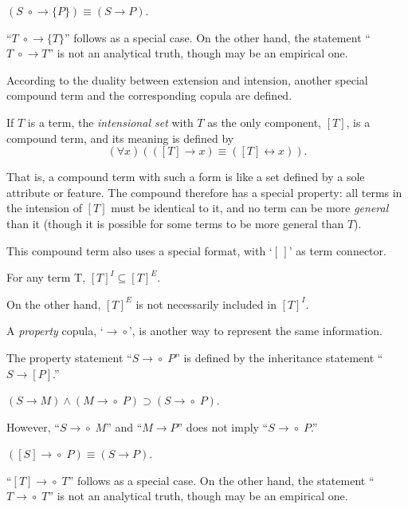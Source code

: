 \begin{theo}
\((S \;\circ\!\!\rightarrow \{P\}) \equiv (S \rightarrow P)\).
\end{theo}
``\(T \;\circ\!\!\rightarrow \{T\}\)'' follows as a special case.  On the other hand, the statement ``\(T \;\circ\!\!\rightarrow T\)'' is not an analytical truth, though may be an empirical one.

According to the duality between extension and intension, another special compound term and the corresponding copula are defined.

\begin{defi}
If $T$ is a term, the {\em intensional set} with $T$ as the only component, \([T]\), is a compound term, and its meaning is defined by
\[(\forall x) (([T] \rightarrow x) \equiv ([T] \leftrightarrow x)).\]
\end{defi}
That is, a compound term with such a form is like a set defined by a sole attribute or feature.  The compound therefore has a special property: all terms in the intension of \([T]\) must be identical to it, and no term can be more \emph{general} than it (though it is possible for some terms to be more general than \(T\)).

This compound term also uses a special format, with `$[\,]$' as term connector.

\begin{theo}
For any term T, \([T]^I \subseteq [T]^E\).
\end{theo}
On the other hand, $[T]^E$ is not necessarily included in $[T]^I$.

A {\em property} copula, `$\rightarrow\!\!\circ$', is another way to represent the same information.
\begin{defi}
The property statement ``\(S \rightarrow\!\!\circ\; P\)'' is defined by the inheritance statement ``\(S \rightarrow [P]\).''
\end{defi}

\begin{theo}
\((S \rightarrow M) \wedge (M \rightarrow\!\!\circ\; P) \supset (S \rightarrow\!\!\circ\; P)\).
\end{theo}
However, ``\(S \rightarrow\!\!\circ\; M\)'' and ``\(M \rightarrow P\)'' does not imply ``\(S \rightarrow\!\!\circ\; P\).''

\begin{theo}
\(([S] \rightarrow\!\!\circ\; P) \equiv (S \rightarrow P)\).
\end{theo}
``\([T] \rightarrow\!\!\circ\; T\)'' follows as a special case.  On the other hand, the statement ``\(T \rightarrow\!\!\circ\; T\)'' is not an analytical truth, though may be an empirical one.

